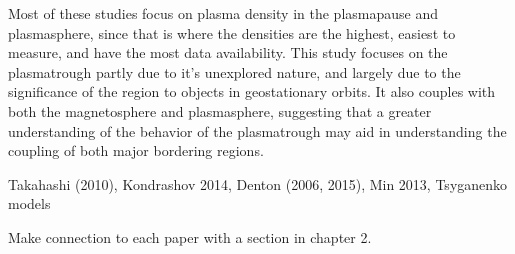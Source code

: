 Most of these studies focus on plasma density in the plasmapause and plasmasphere, since that is where the densities are the highest, easiest to measure, and have the most data availability. This study focuses on the plasmatrough partly due to it's unexplored nature, and largely due to the significance of the region to objects in geostationary orbits. It also couples with both the magnetosphere and plasmasphere, suggesting that a greater understanding of the behavior of the plasmatrough may aid in understanding the coupling of both major bordering regions.

\vnote Takahashi (2010), Kondrashov 2014, Denton (2006, 2015), Min 2013, Tsyganenko models

\note Make connection to each paper with a section in chapter 2.

